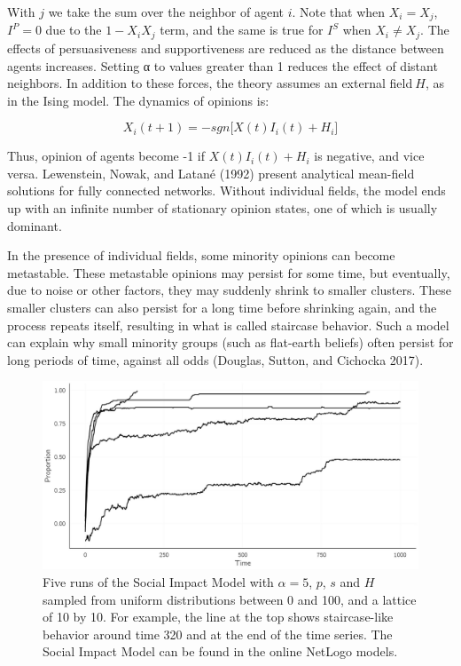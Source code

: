 \documentclass[
  a4paper,
  DIV=11,
  numbers=noendperiod]{scrreprt}
\begin{document}
With \(j\) we take the sum over the neighbor of agent \(i\). Note that
when \(X_{i} = X_{j}\), \(I^{P} = 0\) due to the \(1 - X_{i}X_{j}\)
term, and the same is true for \(I^{S}\) when \(X_{i} \neq X_{j}\). The
effects of persuasiveness and supportiveness are reduced as the distance
between agents increases. Setting α to values greater than 1 reduces the
effect of distant neighbors. In addition to these forces, the theory
assumes an external field\(\ H\), as in the Ising model. The dynamics of
opinions is:

\[X_{i}(t + 1) = - sgn\lbrack X(t)I_{i}(t) + H_{i}\rbrack\]

Thus, opinion of agents become -1 if \(X(t)I_{i}(t) + H_{i}\) is
negative, and vice versa. Lewenstein, Nowak, and Latané (1992) present
analytical mean-field solutions for fully connected networks. Without
individual fields, the model ends up with an infinite number of
stationary opinion states, one of which is usually dominant.

In the presence of individual fields, some minority opinions can become
metastable. These metastable opinions may persist for some time, but
eventually, due to noise or other factors, they may suddenly shrink to
smaller clusters. These smaller clusters can also persist for a long
time before shrinking again, and the process repeats itself, resulting
in what is called staircase behavior. Such a model can explain why small
minority groups (such as flat-earth beliefs) often persist for long
periods of time, against all odds (Douglas, Sutton, and Cichocka 2017).

\begin{figure}

{\centering \includegraphics{media/ch7/fig-ch7-img6-old-94.jpg}

}

\caption{\label{fig-ch7-img6-old-94}Five runs of the Social Impact Model
with \(\alpha = 5\), \(p\), \(s\) and \(H\) sampled from uniform
distributions between 0 and 100, and a lattice of 10 by 10. For example,
the line at the top shows staircase-like behavior around time 320 and at
the end of the time series. The Social Impact Model can be found in the
online NetLogo models.}

\end{figure}
\end{document}
